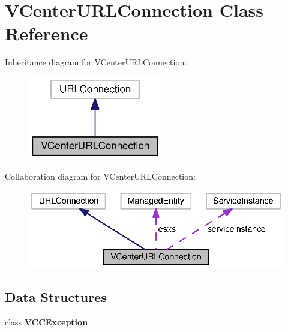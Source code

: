 \section{V\+Center\+U\+R\+L\+Connection Class Reference}
\label{classorg_1_1smallfoot_1_1parser_1_1vmware_1_1VCenterURLConnection}


Inheritance diagram for V\+Center\+U\+R\+L\+Connection\+:\nopagebreak
\begin{figure}[H]
\begin{center}
\leavevmode
\includegraphics[width=166pt]{classorg_1_1smallfoot_1_1parser_1_1vmware_1_1VCenterURLConnection__inherit__graph}
\end{center}
\end{figure}


Collaboration diagram for V\+Center\+U\+R\+L\+Connection\+:\nopagebreak
\begin{figure}[H]
\begin{center}
\leavevmode
\includegraphics[width=336pt]{classorg_1_1smallfoot_1_1parser_1_1vmware_1_1VCenterURLConnection__coll__graph}
\end{center}
\end{figure}
\subsection*{Data Structures}
\begin{DoxyCompactItemize}
\item 
class {\bf V\+C\+C\+Exception}
\end{DoxyCompactItemize}
